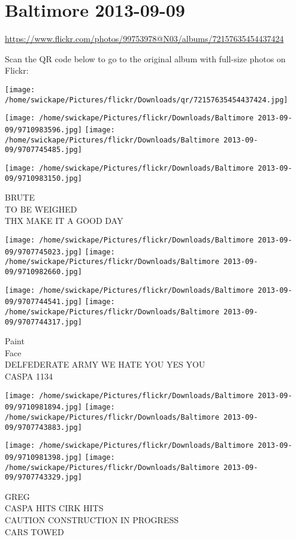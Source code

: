 \documentclass[10pt,letterpaper]{article}
\title{}
\author{}
\date{}
\begin{document}
\section*{Baltimore 2013-09-09}

\url{https://www.flickr.com/photos/99753978@N03/albums/72157635454437424}

Scan the QR code below to go to the original album with full-size photos on Flickr:

\texttt{[image: /home/swickape/Pictures/flickr/Downloads/qr/72157635454437424.jpg]}
\pagebreak

\texttt{[image: /home/swickape/Pictures/flickr/Downloads/Baltimore 2013-09-09/9710983596.jpg]}
\texttt{[image: /home/swickape/Pictures/flickr/Downloads/Baltimore 2013-09-09/9707745485.jpg]}

\vspace{0.25in}
\texttt{[image: /home/swickape/Pictures/flickr/Downloads/Baltimore 2013-09-09/9710983150.jpg]}

BRUTE\\
TO BE WEIGHED\\
THX MAKE IT A GOOD DAY
\pagebreak

\texttt{[image: /home/swickape/Pictures/flickr/Downloads/Baltimore 2013-09-09/9707745023.jpg]}
\texttt{[image: /home/swickape/Pictures/flickr/Downloads/Baltimore 2013-09-09/9710982660.jpg]}

\texttt{[image: /home/swickape/Pictures/flickr/Downloads/Baltimore 2013-09-09/9707744541.jpg]}
\texttt{[image: /home/swickape/Pictures/flickr/Downloads/Baltimore 2013-09-09/9707744317.jpg]}

Paint\\
Face\\
DELFEDERATE ARMY WE HATE YOU YES YOU\\
CASPA 1134
\pagebreak

\texttt{[image: /home/swickape/Pictures/flickr/Downloads/Baltimore 2013-09-09/9710981894.jpg]}
\texttt{[image: /home/swickape/Pictures/flickr/Downloads/Baltimore 2013-09-09/9707743883.jpg]}

\texttt{[image: /home/swickape/Pictures/flickr/Downloads/Baltimore 2013-09-09/9710981398.jpg]}
\texttt{[image: /home/swickape/Pictures/flickr/Downloads/Baltimore 2013-09-09/9707743329.jpg]}

GREG\\
CASPA HITS CIRK HITS\\
CAUTION CONSTRUCTION IN PROGRESS\\
CARS TOWED
\pagebreak
\end{document}
